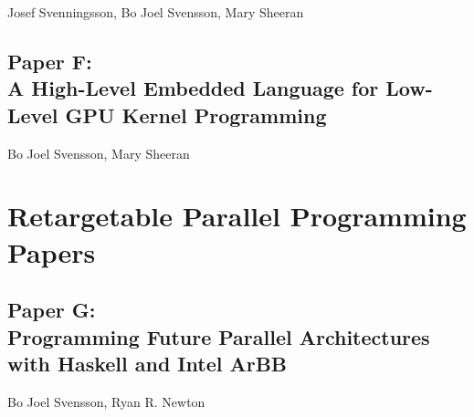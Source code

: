 \documentclass[a4paper]{book}
\newcommand{\paperETitle}{Counting and Occurrence Sort for GPUs using an Embedded Language}
\newcommand{\paperF}{Paper F}
\newcommand{\paperFTitle}{A High-Level Embedded Language for Low-Level GPU Kernel Programming}
\newcommand{\paperG}{Paper G}
\newcommand{\paperGTitle}{Programming Future Parallel Architectures with Haskell and Intel ArBB}
\begin{document}

\begin{center} 
Josef Svenningsson, Bo Joel Svensson, Mary Sheeran 
\end{center}





% 
\cleardoublepage 


\section[\paperFTitle]{\paperF: \\ \paperFTitle}
\label{sec:paperF}


\begin{center} 
Bo Joel Svensson, Mary Sheeran
\end{center}






% 

\chapter{Retargetable Parallel Programming Papers}
\label{chap:ArBB}
% 
\cleardoublepage 


\section[\paperGTitle]{\paperG: \\ \paperGTitle}
\label{sec:paperG}


\begin{center} 
Bo Joel Svensson, Ryan R. Newton
\end{center}



\end{document}
